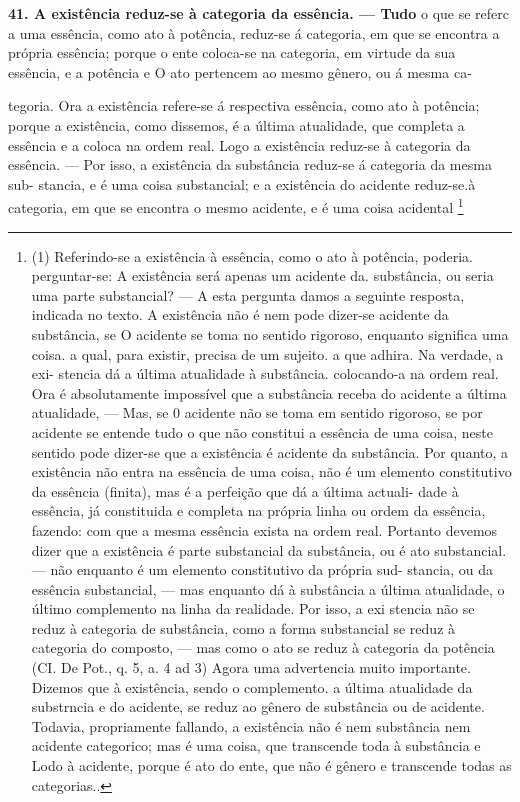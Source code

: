 \documentclass[12pt,a4paper]{article}
\newcommand{\pagmark}[1]{\quad[\textit{p.\,#1}]\quad}
\begin{document}
{{{{{{{{{{{\medskip\noindent\textbf{41. A existência reduz-se à categoria da essência. — Tudo}
 o que se referc a uma essência, como ato à potência, reduz-se
 á categoria, em que se encontra a própria essência; porque o
 ente coloca-se na categoria, em virtude da sua essência, e a
 potência e O ato pertencem ao mesmo gênero, ou á mesma ca-

 tegoria. Ora a existência refere-se á respectiva essência, como
 ato à potência; porque a existência, como dissemos, é a última
 atualidade, que completa a essência e a coloca na ordem real.
 Logo a existência reduz-se à categoria da essência. — Por isso,
 a existência da substância reduz-se á categoria da mesma sub-
 stancia, e é uma coisa substancial; e a existência do acidente
 reduz-se.à categoria, em que se encontra o mesmo acidente, e
 é uma coisa acidental \footnote{(1) Referindo-se a existência à essência, como o ato à potência, poderia.
 perguntar-se: A existência será apenas um acidente da. substância, ou seria
 uma parte substancial? — A esta pergunta damos a seguinte resposta, indicada
 no texto. A existência não é nem pode dizer-se acidente da substância, se
 O acidente se toma no sentido rigoroso, enquanto significa uma coisa. a
 qual, para existir, precisa de um sujeito. a que adhira. Na verdade, a exi-
 stencia dá a última atualidade à substância. colocando-a na ordem real.
 Ora é absolutamente impossível que a substância receba do acidente a última
 atualidade, — Mas, se 0 acidente não se toma em sentido rigoroso, se por
 acidente se entende tudo o que não constitui a essência de uma coisa,
 neste sentido pode dizer-se que a existência é acidente da substância. Por
 quanto, a existência não entra na essência de uma coisa, não é um elemento
 constitutivo da essência (finita), mas é a perfeição que dá a última actuali-
 dade à essência, já  constituida e completa na própria linha ou ordem da
 essência, fazendo: com que a mesma essência exista na ordem real. Portanto
 devemos dizer que a existência é parte substancial da substância, ou é ato
 substancial. — não enquanto é um elemento constitutivo da própria sud-
 stancia, ou da essência substancial, — mas enquanto dá à substância a última
 atualidade, o último complemento na linha da realidade. Por isso, a exi
 stencia não se reduz à categoria de substância, como a forma substancial
 se reduz à categoria do composto, — mas como o ato se reduz à categoria
 da potência (CI. De Pot., q. 5, a. 4 ad 3)
 Agora uma advertencia muito importante. Dizemos que à existência,
 sendo o complemento. a última atualidade da substrncia e do acidente,
 se reduz ao gênero de substância ou de acidente. Todavia, propriamente
 fallando, a existência não é nem substância nem acidente categorico; mas
 é uma coisa, que transcende toda à substância e Lodo à acidente, porque é
 ato do ente, que não é gênero e transcende todas as categorias.. 
\pagmark{314}

}}}}}}}}}}}}
\end{document}
